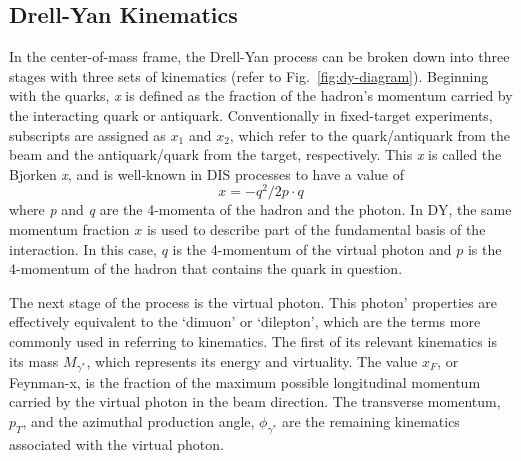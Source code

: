 \subsection{Drell-Yan Kinematics}

In the center-of-mass frame, the Drell-Yan process can be broken down into three stages with three sets of kinematics (refer to Fig.~\ref{fig:dy-diagram}). Beginning with the quarks, \emph{x} is defined as the fraction of the hadron's momentum carried by the interacting quark or antiquark. Conventionally in fixed-target experiments, subscripts are assigned as $x_1$ and $x_2$, which refer to the quark/antiquark from the beam and the antiquark/quark from the target, respectively. This \emph{x} is called the Bjorken \emph{x}, and is well-known in DIS processes to have a value of
\begin{equation}
x = -q^2/2 p \cdot q
\end{equation} where \emph{p} and \emph{q} are the 4-momenta of the hadron and the photon. In DY, the same momentum fraction $x$ is used to describe part of the fundamental basis of the interaction. In this case, $q$ is the 4-momentum of the virtual photon and $p$ is the 4-momentum of the hadron that contains the quark in question.

The next stage of the process is the virtual photon. This photon' properties are effectively equivalent to the `dimuon' or `dilepton', which are the terms more commonly used in referring to kinematics. The first of its relevant kinematics is its mass $M_{\gamma^*}$, which represents its energy and virtuality. The value $x_F$, or Feynman-x, is the fraction of the maximum possible longitudinal momentum carried by the virtual photon in the beam direction. The transverse momentum, $p_T$, and the azimuthal production angle, $\phi_{\gamma^*}$ are the remaining kinematics associated with the virtual photon.


